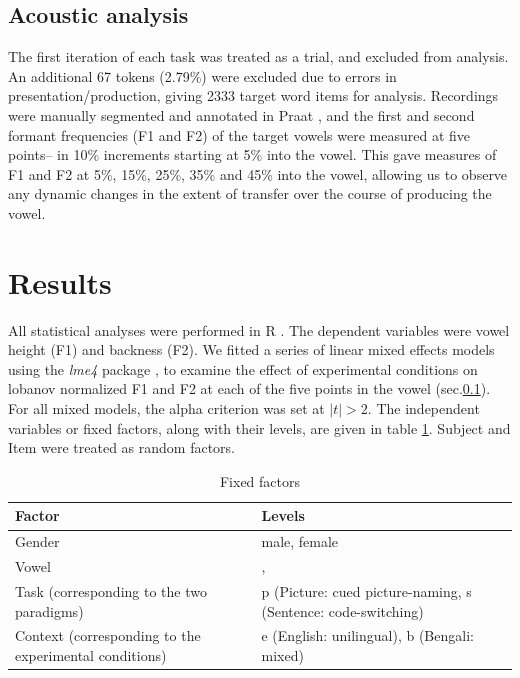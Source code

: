 \documentclass[charis,linguex]{glossa}
\newcommand{\nt}[1]{\textipa{[#1]}} %
\begin{document}
\subsection{Acoustic analysis}\label{analysis}
The first iteration of each task was treated as a trial, and excluded from analysis. An additional 67 tokens (2.79\%) were excluded due to errors in presentation/production, giving 2333 target word items for analysis. Recordings were manually segmented and annotated in Praat \citep{boersma2016praat}, and the first and second formant frequencies (F1 and F2) of the target vowels \nt{2, ae} were measured at five points-- in 10\% increments starting at 5\% into the vowel. This gave measures of F1 and F2 at 5\%, 15\%, 25\%, 35\% and 45\% into the vowel, allowing us to observe any dynamic changes in the extent of transfer over the course of producing the vowel.


\section{Results} \label{results}

All statistical analyses were performed in R \citep{r}. The dependent variables were vowel height (F1) and backness (F2). We fitted a series of linear mixed effects models using the \emph{lme4} package \citep{lme4}, to examine the effect of experimental conditions on lobanov normalized F1 and F2 at each of the five points in the vowel (sec.\ref{analysis}). For all mixed models, the alpha criterion was set at $|t| > 2 $. The independent variables or fixed factors, along with their levels, are given in table \ref{table variables}. Subject and Item were treated as random factors.

\begin{table}
	\caption{Fixed factors}
	\sffamily
	\centering
	\begin{tabular}{p{}p{}}
		\hline 
		Factor & Levels\\ 
		\hline
		Gender & male, female\\
		Vowel & \nt{2}, \nt{\ae} \\
		Task (corresponding to the two paradigms) & p (Picture: cued picture-naming, s (Sentence: code-switching)\\
		Context (corresponding to the experimental conditions) & e (English: unilingual), b (Bengali: mixed)\\ [1ex]
		\hline	
	\end{tabular}
	\label{table variables}
\end{table}
\end{document}

